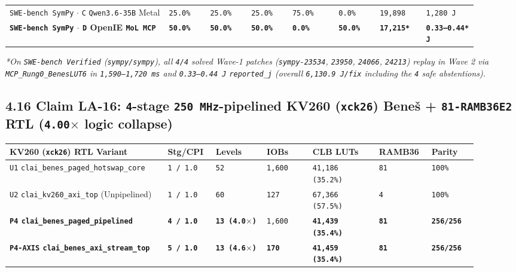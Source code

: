 \documentclass[10pt]{article}
\begin{document}
{\begin{longtable}{@{}L{0.31\linewidth}C{0.08\linewidth}C{0.08\linewidth}C{0.08\linewidth}C{0.09\linewidth}C{0.08\linewidth}C{0.09\linewidth}C{0.10\linewidth}@{}}
\texttt{SWE-bench SymPy} $\cdot$ \texttt{C} \texttt{Qwen3.6-35B} Metal & \texttt{25.0\%} & \texttt{25.0\%} & \texttt{25.0\%} & \texttt{75.0\%} & \texttt{0.0\%} & \texttt{19,898} & \texttt{1,280 J} \\
\textbf{\texttt{SWE-bench SymPy} $\cdot$ \texttt{D} OpenIE \texttt{MoL MCP}} & \textbf{\texttt{50.0\%}} & \textbf{\texttt{50.0\%}} & \textbf{\texttt{50.0\%}} & \textbf{\texttt{0.0\%}} & \textbf{\texttt{50.0\%}} & \textbf{\texttt{17,215*}} & \textbf{\texttt{0.33--0.44* J}} \\
\bottomrule
\end{longtable}
}

\emph{*On \texttt{SWE-bench Verified} (\texttt{sympy/sympy}), all \texttt{4/4} solved Wave-1 patches (\texttt{sympy-23534}, \texttt{23950}, \texttt{24066}, \texttt{24213}) replay in Wave 2 via \texttt{MCP\_Rung0\_BenesLUT6} in \texttt{1,590--1,720 ms} and \texttt{0.33--0.44 J} \texttt{reported\_j} (overall \texttt{6,130.9 J/fix} including the \texttt{4} safe abstentions).}

\subsection{4.16 Claim LA-16: \texttt{4}-stage \texttt{250 MHz}-pipelined KV260 (\texttt{xck26}) Bene\v{s} + \texttt{81-RAMB36E2} RTL (\texttt{4.00\texorpdfstring{$\times$}{x}} logic collapse)}\label{claim-la16}

{\footnotesize\setlength{\tabcolsep}{2.4pt}
\begin{longtable}{@{}L{0.31\linewidth}C{0.09\linewidth}C{0.10\linewidth}C{0.09\linewidth}C{0.13\linewidth}C{0.10\linewidth}C{0.09\linewidth}@{}}
\toprule
\textbf{KV260 (\texttt{xck26}) RTL Variant} & \textbf{Stg/CPI} & \textbf{Levels} & \textbf{IOBs} & \textbf{CLB LUTs} & \textbf{RAMB36} & \textbf{Parity} \\
\midrule
\endhead
\texttt{U1} \texttt{clai\_benes\_paged\_hotswap\_core} & \texttt{1 / 1.0} & \texttt{52} & \texttt{1,600} & \texttt{41,186 (35.2\%)} & \texttt{81} & \texttt{100\%} \\
\texttt{U2} \texttt{clai\_kv260\_axi\_top} (Unpipelined) & \texttt{1 / 1.0} & \texttt{60} & \texttt{127} & \texttt{67,366 (57.5\%)} & \texttt{4} & \texttt{100\%} \\
\textbf{\texttt{P4} \texttt{clai\_benes\_paged\_pipelined}} & \textbf{\texttt{4 / 1.0}} & \textbf{\texttt{13 (4.0$\times$)}} & \texttt{1,600} & \textbf{\texttt{41,439 (35.4\%)}} & \textbf{\texttt{81}} & \textbf{\texttt{256/256}} \\
\textbf{\texttt{P4-AXIS} \texttt{clai\_benes\_axi\_stream\_top}} & \textbf{\texttt{5 / 1.0}} & \textbf{\texttt{13 (4.6$\times$)}} & \textbf{\texttt{170}} & \textbf{\texttt{41,459 (35.4\%)}} & \textbf{\texttt{81}} & \textbf{\texttt{256/256}} \\
\bottomrule
\end{longtable}
}
\end{document}
